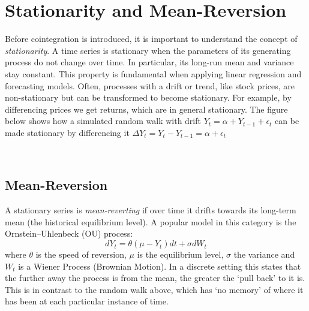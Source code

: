 \documentclass[11pt]{article}
\begin{document}
    
    \section{Stationarity and Mean-Reversion}\label{stationarity-and-mean-reversion}
    
    Before cointegration is introduced, it is important to understand the
concept of {\em stationarity}. A time series is stationary when the parameters
of its generating process do not change over time. In particular, its
long-run mean and variance stay constant. This property is fundamental
when applying linear regression and forecasting models.
Often, processes with a drift or trend, like stock prices, are
non-stationary but can be transformed to become stationary. For example,
by differencing prices we get returns, which are in general stationary.
The figure below shows how a simulated random walk with drift
\(Y_t = \alpha + Y_{t-1} + \epsilon_t\) can be made stationary by
differencing it \( \Delta Y_t = Y_t - Y_{t-1} = \alpha + \epsilon_t\)
    \begin{center}
    \end{center}
    { \hspace*{\fill} \\}
    
    
    \subsection{Mean-Reversion}\label{mean-reversion}
    
    
A stationary series is {\em mean-reverting} if over time it drifts towards its
long-term mean (the historical equilibrium level). A popular model in
this category is the Ornstein--Uhlenbeck (OU) process:
\begin{equation}
dY_t = \theta(\mu - Y_t)dt + \sigma dW_t
\end{equation}
where \(\theta\) is the speed of reversion, \(\mu\) is the equilibrium
level, \(\sigma\) the variance and \(W_t\) is a Wiener Process (Brownian
Motion). In a discrete setting this states that the further away the
process is from the mean, the greater the `pull back' to it is. This is
in contrast to the random walk above, which has `no memory' of where
it has been at each particular instance of time.
\end{document}
